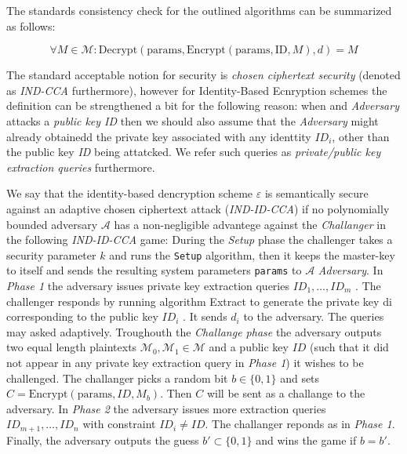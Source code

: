 The standards consistency check for the outlined algorithms can be
summarized as follows:

\begin{equation}
	\forall M \in \mathcal{M}: \mathrm{Decrypt}(\mathrm{params}, \mathrm{Encrypt}(\mathrm{params}, \mathrm{ID}, M),d) = M
\end{equation}

The standard acceptable notion for security
is \textit{chosen ciphertext security} (denoted as \textit{IND-CCA} furthermore), however
for Identity-Based Ecnryption schemes the definition can be strengthened a bit for the following reason: when and \textit{Adversary} attacks a \textit{public key ID} then we should also assume that the \textit{Adversary} might already obtainedd the private key associated with any identtity $ID_i$, other than the public key \textit{ID} being attatcked.  We refer such queries as\textit{ private/public key extraction queries} furthermore. \cite{BF01}

We say that the identity-based dencryption scheme $\varepsilon$ is semantically secure against an adaptive
chosen ciphertext attack (\textit{IND-ID-CCA}) if no polynomially bounded adversary $\mathcal{A}$ has a non-negligible advantege against the \textit{Challanger} in the following \textit{IND-ID-CCA} game:
	During the \textit{Setup} phase the challenger takes a security parameter $k$ and runs the \lstinline|Setup| algorithm, then it keeps the master-key to itself and sends the resulting system parameters \lstinline|params| to $\mathcal{A}$ \textit{Adversary}\cite{BF01}. 	
	In \textit{Phase 1} the adversary issues private key extraction queries $ID_1, \ldots, ID_m$ . The challenger 	responds by running algorithm Extract to generate the private key di corresponding to the public key $ID_i$ . It sends $d_i$ to the adversary. The queries may asked adaptively. 	Troughouth the \textit{Challange phase} the adversary outputs two equal length
	plaintexts $\mathcal{M}_0, \mathcal{M}_1 \in \mathcal{M}$ and a public key $ID$ (such that it did not appear in any private key extraction query in \textit{Phase 1}) it 
	wishes to be challenged.  The challanger picks a random bit $b \in \{0,1\}$ and sets $C = \mathrm{Encrypt}(\mathrm{params}, ID, M_b)$. Then $C$ will be sent as a challange to the adversary. 	In \textit{Phase 2} the adversary issues more extraction queries $ID_{m+1}, \ldots, ID_n$ with constraint $ID_i \neq ID$. The challanger reponds as in \textit{Phase 1}. Finally, the adversary outputs the guess $b' \subset \{0,1\}$ and wins the game if $b = b'$.\cite{BF01}
	
